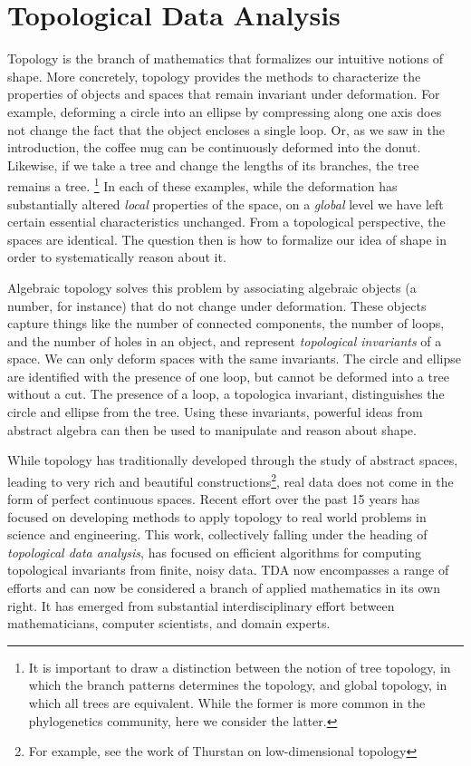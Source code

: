 

\section{Topological Data Analysis}

Topology is the branch of mathematics that formalizes our intuitive notions of shape.
More concretely, topology provides the methods to characterize the properties of objects and spaces that remain invariant under deformation.
For example, deforming a circle into an ellipse by compressing along one axis does not change the fact that the object encloses a single loop.
Or, as we saw in the introduction, the coffee mug can be continuously deformed into the donut.
Likewise, if we take a tree and change the lengths of its branches, the tree remains a tree.
\footnote{It is important to draw a distinction between the notion of tree topology, in which the branch patterns determines the topology, and global topology, in which all trees are equivalent. While the former is more common in the phylogenetics community, here we consider the latter.}
In each of these examples, while the deformation has substantially altered \emph{local} properties of the space, on a \emph{global} level we have left certain essential characteristics unchanged.
From a topological perspective, the spaces are identical.
The question then is how to formalize our idea of shape in order to systematically reason about it.

Algebraic topology solves this problem by associating algebraic objects (a number, for instance) that do not change under deformation.
These objects capture things like the number of connected components, the number of loops, and the number of holes in an object, and represent \emph{topological invariants} of a space.
We can only deform spaces with the same invariants.
The circle and ellipse are identified with the presence of one loop, but cannot be deformed into a tree without a cut.
The presence of a loop, a topologica invariant, distinguishes the circle and ellipse from the tree.
Using these invariants, powerful ideas from abstract algebra can then be used to manipulate and reason about shape.

While topology has traditionally developed through the study of abstract spaces, leading to very rich and beautiful constructions\footnote{For example, see the work of Thurstan on low-dimensional topology}, real data does not come in the form of perfect continuous spaces.
Recent effort over the past 15 years has focused on developing methods to apply topology to real world problems in science and engineering.
This work, collectively falling under the heading of \emph{topological data analysis}, has focused on efficient algorithms for computing topological invariants from finite, noisy data.
TDA now encompasses a range of efforts and can now be considered a branch of applied mathematics in its own right.
It has emerged from substantial interdisciplinary effort between mathematicians, computer scientists, and domain experts.

